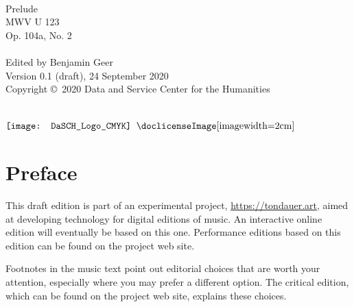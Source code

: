 \documentclass[a4paper, 12pt]{book}
\begin{document}
\frontmatter


\begin{titlepage}
\begin{center}
   \\
  \vspace{2cm}
  {\fontsize{32}{42}\selectfont Prelude} \\
  \vspace{2 cm}
  {\fontsize{24}{34}\selectfont MWV U 123} \\
  \vspace{0.5 cm}
  {\fontsize{24}{34}\selectfont Op. 104a, No. 2} \\
  \vspace{4 cm}
  {\Large {}} \\
  \vspace{0.5 cm}
  {\Large Edited by Benjamin Geer} \\
  \vspace{4.5 cm}
  {\footnotesize Version 0.1 (draft), 24 September 2020} \\
  \vspace{0.1 cm}
  {\footnotesize Copyright \copyright\ 2020 Data and Service Center
    for the Humanities \\ \doclicenseText} \\
  \begin{minipage}{\textwidth}
  \centering
  $\vcenter{\hbox{\texttt{[image: DaSCH\_Logo\_CMYK]}}}$
  \hspace*{.5 cm}
  $\vcenter{\hbox{\doclicenseImage[imagewidth=2cm]}}$
  \end{minipage}
  \end{center}
\end{titlepage}


\chapter*{Preface}

This draft edition is part of an experimental project,
\url{https://tondauer.art}, aimed at developing technology for digital
editions of music.
\ifdef{\critical}
  {%
    An interactive online edition will eventually be based on this
    one. Performance editions based on this edition can be found on
    the project web site.
  }{%
    
    Footnotes in the music text point out editorial choices that are
    worth your attention, especially where you may prefer a different
    option. The critical edition, which can be found on the project
    web site, explains these choices.

  }
\end{document}
